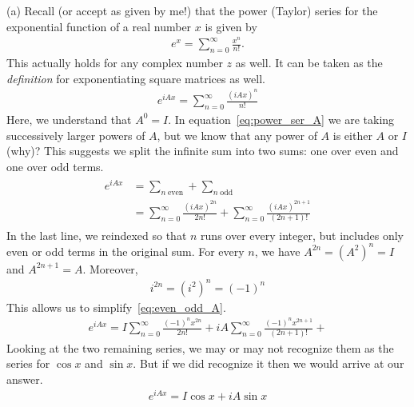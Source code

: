 \documentclass{book}
\begin{document}
    (a) Recall (or accept as given by me!) that the power (Taylor) series for the exponential function of a real number $x$ is given by
    \begin{align}
        e^x = \sum_{n=0}^\infty \frac{x^n}{n!}.
    \end{align}
    This actually holds for any complex number $z$ as well. It can be taken as the \emph{definition} for exponentiating square matrices as well.
    \begin{align} \label{eq:power_ser_A}
        e^{i A x} = \sum_{n=0}^\infty \frac{(i A x)^n}{n!}
    \end{align}
    Here, we understand that $A^0 = I$. In equation~\eqref{eq:power_ser_A} we are taking successively larger powers of $A$, but we know that any power of $A$ is either $A$ or $I$ (why)? This suggests we split the infinite sum into two sums: one over even and one over odd terms.
    \begin{align} \label{eq:even_odd_A}
    \begin{aligned}
        e^{iAx} &= \sum_{n\; \text{even}} + \sum_{n\;\text{odd}} \\
        &= \sum_{n = 0}^\infty \frac{(i A x)^{2n}}{2n!} + \sum_{n = 0}^\infty \frac{(i A x)^{2n+1}}{(2n+1)!}
    \end{aligned}
    \end{align}
    In the last line, we reindexed so that $n$ runs over every integer, but includes only even or odd terms in the original sum. For every $n$, we have $A^{2n} = (A^2)^n = I$ and $A^{2n+1} = A$. Moreover,
    \begin{align}
        i^{2n} = (i^2)^n = (-1)^n
    \end{align}
    This allows us to simplify~\eqref{eq:even_odd_A}.
    \begin{align}
        e^{iAx} =  I \sum_{n = 0}^\infty \frac{(-1)^n x^{2n}}{2n!} + i A \sum_{n = 0}^\infty \frac{(-1)^n x^{2n+1}}{(2n+1)!} + 
    \end{align}
    Looking at the two remaining series, we may or may not recognize them as the series for $\cos x$ and $\sin x$. But if we did recognize it then we would arrive at our answer.
    \begin{align}
        e^{iAx} = I \cos x + i A \sin x
    \end{align}
    
\end{document}
